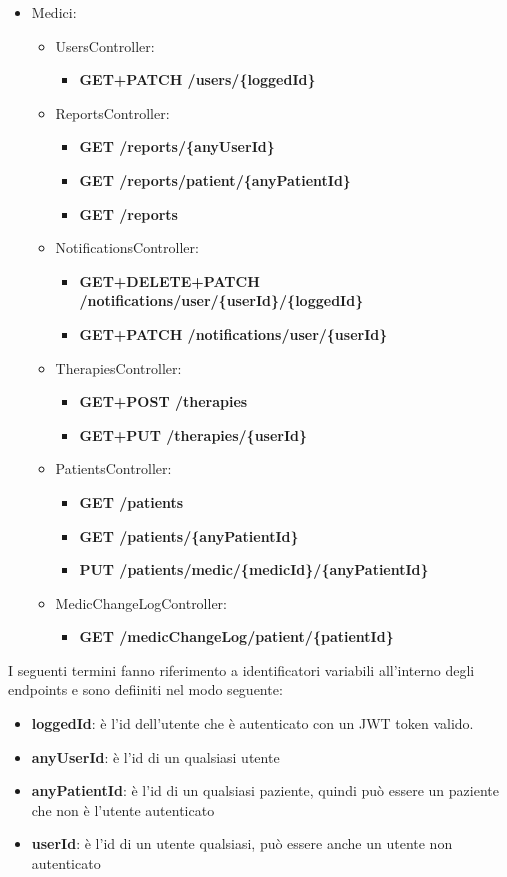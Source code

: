\documentclass[a4paper]{article}
\begin{document}
\begin{itemize}
  \item Medici:
  \begin{itemize}
    \item UsersController:
    \begin{itemize}
      \item \textbf{GET+PATCH /users/\{loggedId\}} 
    \end{itemize}
    \item ReportsController:
    \begin{itemize}
      \item \textbf{GET /reports/\{anyUserId\}}
      \item \textbf{GET /reports/patient/\{anyPatientId\}}
      \item \textbf{GET /reports}
    \end{itemize}
    \item NotificationsController:
    \begin{itemize}
      \item \textbf{GET+DELETE+PATCH /notifications/user/\{userId\}/\{loggedId\}}
      \item \textbf{GET+PATCH /notifications/user/\{userId\}}
    \end{itemize}
    \item TherapiesController:
    \begin{itemize}
      \item \textbf{GET+POST /therapies}
      \item \textbf{GET+PUT /therapies/\{userId\}}
    \end{itemize}
    \item PatientsController:
    \begin{itemize}
      \item \textbf{GET /patients}
      \item \textbf{GET /patients/\{anyPatientId\}}
      \item \textbf{PUT /patients/medic/\{medicId\}/\{anyPatientId\}}
    \end{itemize}
    \item MedicChangeLogController:
    \begin{itemize}
      \item \textbf{GET /medicChangeLog/patient/\{patientId\}}
    \end{itemize}
  \end{itemize}
\end{itemize}
\noindent
I seguenti termini fanno riferimento a identificatori variabili all'interno degli endpoints
e sono defiiniti nel modo seguente:
\begin{itemize}
  \item \textbf{loggedId}: è l'id dell'utente che è autenticato
  con un JWT token valido.
  \item \textbf{anyUserId}: è l'id di un qualsiasi utente
  \item \textbf{anyPatientId}: è l'id di un qualsiasi paziente, quindi può 
  essere un paziente che non è l'utente autenticato
  \item \textbf{userId}: è l'id di un utente qualsiasi, può essere anche un utente non autenticato
\end{itemize}
\end{document}
